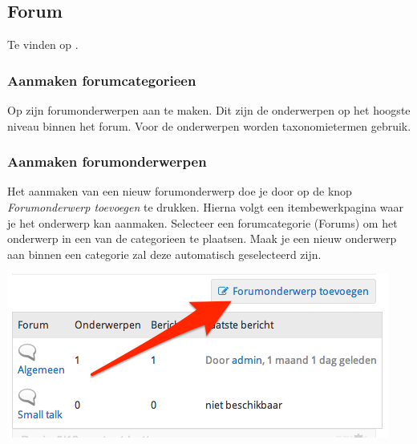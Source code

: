 \subsection{Forum}\label{forum}
Te vinden op .

\subsubsection{Aanmaken forumcategorieen}\label{forumcategorieen}
Op  zijn forumonderwerpen aan te maken. Dit zijn de onderwerpen op het hoogste niveau binnen het forum. Voor de onderwerpen worden taxonomietermen gebruik.

\subsubsection{Aanmaken forumonderwerpen}\label{forumonderwerpen}
Het aanmaken van een nieuw forumonderwerp doe je door op de knop \emph{Forumonderwerp toevoegen} te drukken. Hierna volgt een itembewerkpagina waar je het onderwerp kan aanmaken. Selecteer een forumcategorie (Forums) om het onderwerp in een van de categorieen te plaatsen. Maak je een nieuw onderwerp aan binnen een categorie zal deze automatisch geselecteerd zijn.

\begin{center}
	\includegraphics[width=\textwidth]{img/forumonderwerp.png}
\end{center}